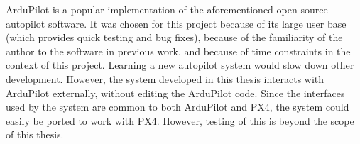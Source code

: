 ArduPilot is a popular implementation of the aforementioned open source autopilot software. It was chosen for this project because of its large user base (which provides quick testing and bug fixes), because of the familiarity of the author to the software in previous work, and because of time constraints in the context of this project. Learning a new autopilot system would slow down other development. However, the system developed in this thesis interacts with ArduPilot externally, without editing the ArduPilot code. Since the interfaces used by the system are common to both ArduPilot and PX4, the system could easily be ported to work with PX4. However, testing of this is beyond the scope of this thesis.